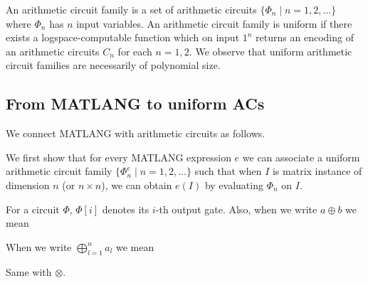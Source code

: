 An arithmetic circuit family is a set of arithmetic circuits $\{\Phi_n\mid n=1,2,\ldots\}$ where $\Phi_n$ has $n$ input variables. An arithmetic circuit family is uniform if there exists a logspace-computable function
which on input $1^n$ returns an encoding of an arithmetic circuits $C_n$ for each $n=1,2$. We observe that
uniform arithmetic circuit families are necessarily of polynomial size.

\subsection{From MATLANG to uniform ACs}
We connect MATLANG with arithmetic circuits as follows.

We first show that for every MATLANG expression $e$ we can associate a uniform arithmetic circuit family $\{\Phi_n^e\mid n=1,2,\ldots\}$ such that when $I$ is matrix instance of dimension $n$ (or $n\times n$), we can obtain $e(I)$ by evaluating $\Phi_n$ on $I$. 

For a circuit $\Phi$, $\Phi[i]$ denotes its $i$-th output gate. Also, when we write $a \oplus b$ we mean 

\begin{center}
\end{center}

When we write $\bigoplus_{l=1}^n a_l$ we mean 

\begin{center}
\end{center}

Same with $\otimes$.


